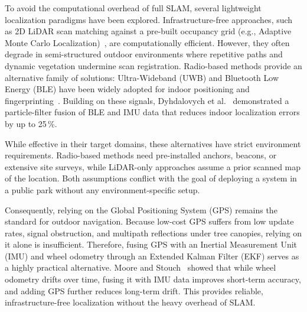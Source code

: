 To avoid the computational overhead of full SLAM, several lightweight localization paradigms have been explored. Infrastructure-free approaches, such as 2D LiDAR scan matching against a pre-built occupancy grid (e.g., Adaptive Monte Carlo Localization)~\cite{thrun2005probabilistic}, are computationally efficient. However, they often degrade in semi-structured outdoor environments where repetitive paths and dynamic vegetation undermine scan registration. Radio-based methods provide an alternative family of solutions: Ultra-Wideband (UWB) and Bluetooth Low Energy (BLE) have been widely adopted for indoor positioning and fingerprinting~\cite{stefanoni2025survey}. Building on these signals, Dyhdalovych et al.~\cite{dyhdalovych2025ble} demonstrated a particle-filter fusion of BLE and IMU data that reduces indoor localization errors by up to 25\,\%.

While effective in their target domains, these alternatives have strict environment requirements. Radio-based methods need pre-installed anchors, beacons, or extensive site surveys, while LiDAR-only approaches assume a prior scanned map of the location. Both assumptions conflict with the goal of deploying a system in a public park without any environment-specific setup.

Consequently, relying on the Global Positioning System (GPS) remains the standard for outdoor navigation. Because low-cost GPS suffers from low update rates, signal obstruction, and multipath reflections under tree canopies, relying on it alone is insufficient. Therefore, fusing GPS with an Inertial Measurement Unit (IMU) and wheel odometry through an Extended Kalman Filter (EKF) serves as a highly practical alternative. 
Moore and Stouch~\cite{moore2015ekf} showed that while wheel odometry drifts over time, fusing it with IMU data improves short-term accuracy, and adding GPS further reduces long-term drift. This provides reliable, infrastructure-free localization without the heavy overhead of SLAM.

